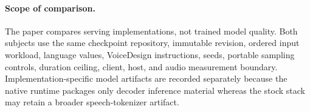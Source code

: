 \paragraph{Scope of comparison.}
The paper compares serving implementations, not trained model quality. Both
subjects use the same checkpoint repository, immutable revision, ordered input
workload, language values, VoiceDesign instructions, seeds, portable sampling
controls, duration ceiling, client, host, and audio measurement boundary.
Implementation-specific model artifacts are recorded separately because the
native runtime packages only decoder inference material whereas the stock stack
may retain a broader speech-tokenizer artifact.
